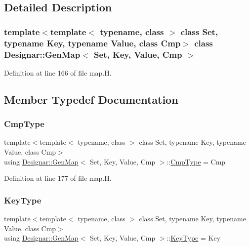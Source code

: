 \subsection{Detailed Description}
\subsubsection*{template$<$template$<$ typename, class $>$ class Set, typename Key, typename Value, class Cmp$>$\newline
class Designar\+::\+Gen\+Map$<$ Set, Key, Value, Cmp $>$}



Definition at line 166 of file map.\+H.



\subsection{Member Typedef Documentation}
\mbox{\label{class_designar_1_1_gen_map_ac80521be38e4e808bcbeb7041da7d813}} 
\subsubsection{\texorpdfstring{Cmp\+Type}{CmpType}}
{\footnotesize\ttfamily template$<$template$<$ typename, class $>$ class Set, typename Key, typename Value, class Cmp$>$ \\
using \hyperlink{class_designar_1_1_gen_map}{Designar\+::\+Gen\+Map}$<$ Set, Key, Value, Cmp $>$\+::\hyperlink{class_designar_1_1_gen_map_ac80521be38e4e808bcbeb7041da7d813}{Cmp\+Type} =  Cmp}



Definition at line 177 of file map.\+H.

\mbox{\label{class_designar_1_1_gen_map_aeb697a86f4ad13eadc36bf5cc967f26f}} 
\subsubsection{\texorpdfstring{Key\+Type}{KeyType}}
{\footnotesize\ttfamily template$<$template$<$ typename, class $>$ class Set, typename Key, typename Value, class Cmp$>$ \\
using \hyperlink{class_designar_1_1_gen_map}{Designar\+::\+Gen\+Map}$<$ Set, Key, Value, Cmp $>$\+::\hyperlink{class_designar_1_1_gen_map_aeb697a86f4ad13eadc36bf5cc967f26f}{Key\+Type} =  Key}




